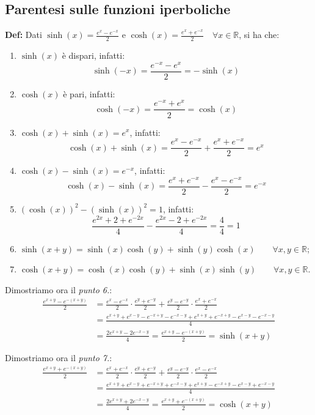 \documentclass{article}
\begin{document}
\subsection{Parentesi sulle funzioni iperboliche}
\textbf{Def:} Dati $\sinh(x) = \frac{e^x - e^{-x}}{2}$ e $\cosh(x) = \frac{e^x + e^{-x}}{2} \quad \forall x \in \mathbb{R}$, si ha che:
\begin{enumerate}
    \item $\sinh(x)$ è dispari, infatti: $$\sinh(-x) = \frac{e^{-x} - e^x}{2} = -\sinh(x)$$
    \item $\cosh(x)$ è pari, infatti: $$\cosh(-x) = \frac{e^{-x} + e^x}{2} = \cosh(x)$$
    \item $\cosh(x) + \sinh(x) = e^x$, infatti: $$\cosh(x) + \sinh(x) = \frac{e^x - e^{-x}}{2} + \frac{e^x + e^{-x}}{2} = e^x$$
    \item $\cosh(x) - \sinh(x) = e^{-x}$, infatti: $$\cosh(x) - \sinh(x) = \frac{e^x + e^{-x}}{2} - \frac{e^x - e^{-x}}{2} = e^{-x}$$ 
    \item $(\cosh(x))^2 - (\sinh(x))^2 = 1$, infatti: $$\frac{e^{2x} + 2 + e^{-2x}}{4} - \frac{e^{2x} - 2 + e^{-2x}}{4} = \frac{4}{4} = 1$$
    \item $\sinh(x + y) = \sinh(x)\cosh(y) + \sinh(y)\cosh(x) \qquad \forall x, y \in \mathbb{R}$;
    \item $\cosh(x + y) = \cosh(x)\cosh(y) + \sinh(x)\sinh(y) \qquad \forall x, y \in \mathbb{R}$.
\end{enumerate}

\noindent Dimostriamo ora il \textit{punto 6.}:
\begin{align*}
    \frac{e^{x + y} - e^{-(x + y)}}{2} &= \frac{e^x - e^{-x}}{2} \cdot \frac{e^y + e^{-y}}{2} + \frac{e^y - e^{-y}}{2} \cdot \frac{e^x + e^{-x}}{2} \\ 
    &= \frac{e^{x + y} + e^{x - y} - e^{-x + y} - e^{-x - y} + e^{x + y} + e^{-x + y} - e^{x - y} - e^{- x - y}}{4} \\
    &= \frac{2e^{x + y} - 2e^{-x - y}}{4} = \frac{e^{x + y} - e^{- (x + y)}}{2} = \sinh(x + y)
\end{align*}

\noindent Dimostriamo ora il \textit{punto 7.}:
\begin{align*}
    \frac{e^{x + y} + e^{- (x + y)}}{2} &= \frac{e^x + e^{-x}}{2} \cdot \frac{e^y + e^{-y}}{2} + \frac{e^y - e^{-y}}{2} \cdot \frac{e^x - e^{-x}}{2} \\
    &= \frac{e^{x + y} + e^{x - y} + e^{-x + y} + e^{-x - y} + e^{x + y} - e^{-x + y} - e^{x - y} + e^{- x - y}}{4} \\
    &= \frac{2e^{x + y} + 2e^{- x - y}}{4} = \frac{e^{x + y} + e^{- (x + y)}}{2} = \cosh(x + y)
\end{align*}
\end{document}
